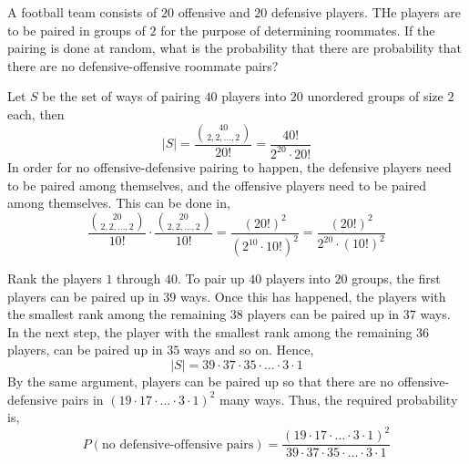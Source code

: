 \begin{example}
    A football team consists of $20$ offensive and $20$ defensive players. THe
players are to be paired in groups of $2$ for the purpose of determining
roommates. If the pairing is done at random, what is the probability that there
are probability that there are no defensive-offensive roommate pairs?
\end{example}
\begin{solution}
    Let $S$ be the set of ways of pairing $40$ players into $20$ unordered
groups of size $2$ each, then 
\begin{equation*}
    \vert S \vert 
    = \frac{{40 \choose {2, 2, \dots, 2}}}{20!}
    = \frac{40!}{2^{20} \cdot 20!}
\end{equation*}
In order for no offensive-defensive pairing to happen, the defensive players
need to be paired among themselves, and the offensive players need to be paired
among themselves. This can be done in,
\begin{equation*}
    \frac{{20 \choose {2, 2, \dots, 2}}}{10!} \cdot \frac{{20 \choose {2, 2,
    \dots, 2}}}{10!}
    = \frac{(20!)^2}{(2^{10} \cdot 10!)^2}
    = \frac{(20!)^2}{2^{20} \cdot (10!)^2}
\end{equation*}
\end{solution}
\begin{solution}
    Rank the players $1$ through $40$. To pair up $40$ players into $20$
groups, the first players can be paired up in $39$ ways. Once this has
happened, the players with the smallest rank among the remaining $38$ players
can be paired up in $37$ ways. In the next step, the player with the smallest
rank among the remaining $36$ players, can be paired up in $35$ ways and so on.
Hence, 
\begin{equation*}
    \vert S \vert = 39 \cdot 37 \cdot 35 \cdot \dots \cdot 3 \cdot 1
\end{equation*}
    By the same argument, players can be paired up so that there are no
offensive-defensive pairs in $(19 \cdot 17 \cdot \dots \cdot 3 \cdot 1)^2$ many
ways. Thus, the required probability is, 
\begin{equation*}
    P(\text{no defensive-offensive pairs}) = 
    \frac{(19 \cdot 17 \cdot \dots \cdot 3 \cdot 1)^2}
         {39 \cdot 37 \cdot 35 \cdot \dots \cdot 3 \cdot 1}
\end{equation*}
\end{solution}

